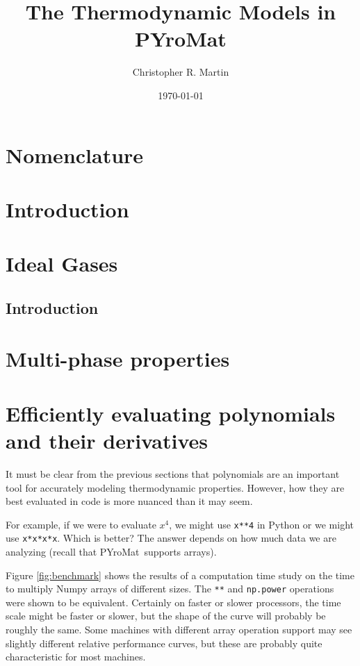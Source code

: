 \documentclass[letterpaper,11pt]{article}
\title{The Thermodynamic Models in PYroMat}
\author{Christopher R. Martin}
\date{\today}
\newcommand{\PM}{PYroMat}
\begin{document}
\maketitle

\section*{Nomenclature}

\section{Introduction}

\section{Ideal Gases}

\subsection{Introduction}


\section{Multi-phase properties}

\section{Efficiently evaluating polynomials and their derivatives}

It must be clear from the previous sections that polynomials are an important tool for accurately modeling thermodynamic properties.  However, how they are best evaluated in code is more nuanced than it may seem.  

For example, if we were to evaluate $x^4$, we might use \verb|x**4| in Python or we might use \verb|x*x*x*x|.  Which is better?  The answer depends on how much data we are analyzing (recall that \PM\ supports arrays).

Figure \ref{fig:benchmark} shows the results of a computation time study on the time to multiply Numpy arrays of different sizes.  The \verb|**| and \verb|np.power| operations were shown to be equivalent.  Certainly on faster or slower processors, the time scale might be faster or slower, but the shape of the curve will probably be roughly the same.  Some machines with different array operation support may see slightly different relative performance curves, but these are probably quite characteristic for most machines.
\end{document}
